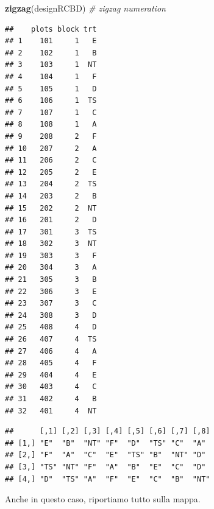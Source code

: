 \documentclass[a4paper,12pt,oneside]{book}
\newenvironment{Shaded}{\begin{snugshade}}{\end{snugshade}}
\newcommand{\KeywordTok}[1]{\textcolor[rgb]{0.13,0.29,0.53}{\textbf{#1}}}
\newcommand{\CommentTok}[1]{\textcolor[rgb]{0.56,0.35,0.01}{\textit{#1}}}
\newcommand{\OperatorTok}[1]{\textcolor[rgb]{0.81,0.36,0.00}{\textbf{#1}}}
\newcommand{\NormalTok}[1]{#1}
\begin{document}
\begin{Shaded}
\begin{Highlighting}[]
\KeywordTok{zigzag}\NormalTok{(designRCBD) }\CommentTok{# zigzag numeration}
\end{Highlighting}
\end{Shaded}

\begin{verbatim}
##    plots block trt
## 1    101     1   E
## 2    102     1   B
## 3    103     1  NT
## 4    104     1   F
## 5    105     1   D
## 6    106     1  TS
## 7    107     1   C
## 8    108     1   A
## 9    208     2   F
## 10   207     2   A
## 11   206     2   C
## 12   205     2   E
## 13   204     2  TS
## 14   203     2   B
## 15   202     2  NT
## 16   201     2   D
## 17   301     3  TS
## 18   302     3  NT
## 19   303     3   F
## 20   304     3   A
## 21   305     3   B
## 22   306     3   E
## 23   307     3   C
## 24   308     3   D
## 25   408     4   D
## 26   407     4  TS
## 27   406     4   A
## 28   405     4   F
## 29   404     4   E
## 30   403     4   C
## 31   402     4   B
## 32   401     4  NT
\end{verbatim}

\begin{Shaded}
\end{Shaded}

\begin{verbatim}
##      [,1] [,2] [,3] [,4] [,5] [,6] [,7] [,8]
## [1,] "E"  "B"  "NT" "F"  "D"  "TS" "C"  "A" 
## [2,] "F"  "A"  "C"  "E"  "TS" "B"  "NT" "D" 
## [3,] "TS" "NT" "F"  "A"  "B"  "E"  "C"  "D" 
## [4,] "D"  "TS" "A"  "F"  "E"  "C"  "B"  "NT"
\end{verbatim}

Anche in questo caso, riportiamo tutto sulla mappa.
\end{document}
